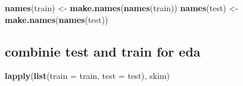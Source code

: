 \documentclass[
]{article}
\newenvironment{Shaded}{\begin{snugshade}}{\end{snugshade}}
\newcommand{\DataTypeTok}[1]{\textcolor[rgb]{0.13,0.29,0.53}{#1}}
\newcommand{\KeywordTok}[1]{\textcolor[rgb]{0.13,0.29,0.53}{\textbf{#1}}}
\newcommand{\NormalTok}[1]{#1}
\newcommand{\StringTok}[1]{\textcolor[rgb]{0.31,0.60,0.02}{#1}}
\begin{document}
\begin{Shaded}
\begin{Highlighting}[]
\KeywordTok{names}\NormalTok{(train) <-}\StringTok{ }\KeywordTok{make.names}\NormalTok{(}\KeywordTok{names}\NormalTok{(train))}
\KeywordTok{names}\NormalTok{(test) <-}\StringTok{ }\KeywordTok{make.names}\NormalTok{(}\KeywordTok{names}\NormalTok{(test))}
\end{Highlighting}
\end{Shaded}

\hypertarget{combinie-test-and-train-for-eda}{%
\subsection{combinie test and train for
eda}\label{combinie-test-and-train-for-eda}}

\begin{Shaded}
\begin{Highlighting}[]
\KeywordTok{lapply}\NormalTok{(}\KeywordTok{list}\NormalTok{(}\DataTypeTok{train =}\NormalTok{ train, }\DataTypeTok{test =}\NormalTok{ test), skim)}
\end{Highlighting}
\end{Shaded}
\end{document}
